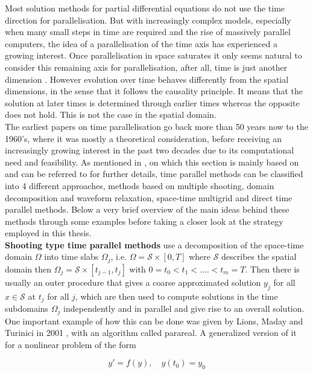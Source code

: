 \documentclass[../draft_1.tex]{subfiles}
\begin{document}
Most solution methods for partial differential equations  do not use the time direction for parallelisation. But with increasingly complex models, especially when many small steps in time are required and the rise of massively parallel computers, the idea of a parallelisation of the time axis has experienced a growing interest. Once parallelisation in space saturates it only seems natural to consider this remaining axis for parallelisation, after all, time is just another dimension \cite{gander201550}. However evolution over time behaves differently from the spatial dimensions, in the sense that it follows the causality principle. It means that the solution at later times is determined through earlier times whereas the opposite does not hold. This is not the case in the spatial domain. 
\smallskip
\\ 
The earliest papers on time parallelisation go back more than 50 years now to the 1960's, where it was mostly a theoretical consideration, before receiving an increasingly growing interest in the past two decades due to its computational need and feasibility. As mentioned in \cite{gander201550}, on which this section is mainly based on and can be referred to for further details, time parallel methods can be classified into 4 different approaches, methods based on multiple shooting, domain decomposition and waveform relaxation, space-time multigrid and direct time parallel methods. Below a very brief overview of the main ideas behind these methods through some examples before taking a closer look at the strategy employed in this thesis. 
\smallskip
\\
\textbf{Shooting type time parallel methods} use a decomposition of the space-time domain $\Omega$ into time slabs $\Omega_j$, i.e. $\Omega = \mathcal{S} \times [0, T]$  where $\mathcal{S}$ describes the spatial domain then $ \Omega_j =  \mathcal{S} \times [t_{j-1}, t_j]$ with $0 = t_0 < t_1 < .... < t_m = T$. Then there is usually an outer procedure that gives a coarse approximated solution $y_j$ for all $ x \in \mathcal{S}$ at $t_j$ for all $j$, which are then used to compute solutions in the time subdomains $\Omega_j$ independently and in parallel and give rise to an overall solution. One important example of how this can be done was given by Lions, Maday and Turinici in 2001 \cite{lions2001resolutionions2001resolution}, with an algorithm called parareal. A generalized version of it for a nonlinear problem of the form
\begin{ceqn}
	\begin{equation}
	y' = f(y), \quad y(t_0) = y_0
	\end{equation}
\end{ceqn}
\end{document}
